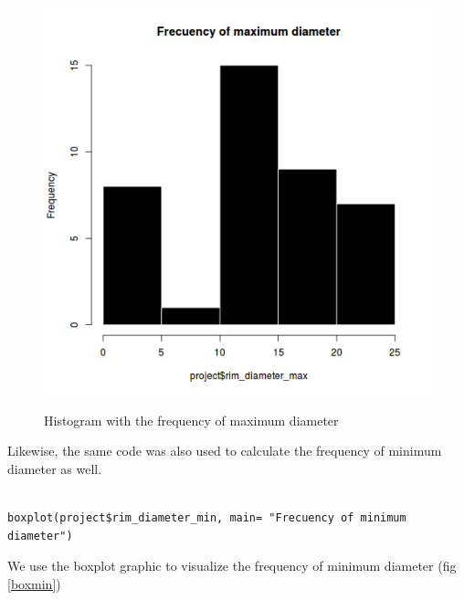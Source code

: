\documentclass[10pt,a4paper]{article}
\begin{document}
\begin{figure}[hdp]
\centering
\includegraphics[scale=0.30]{histomax.png}
\label{histomax}
\caption{Histogram with the frequency of maximum diameter}
\end{figure} 

Likewise, the same code was also used to calculate the frequency of minimum diameter as well. 

\begin{verbatim}

boxplot(project$rim_diameter_min, main= "Frecuency of minimum diameter")

\end{verbatim}

We use the boxplot graphic to visualize the frequency of minimum diameter (fig \ref{boxmin})
\end{document}
